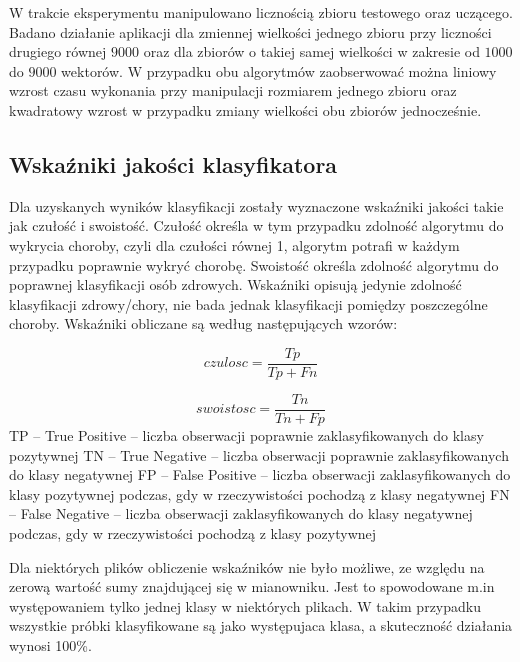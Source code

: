 W trakcie eksperymentu manipulowano licznością zbioru testowego oraz uczącego. Badano działanie aplikacji dla zmiennej wielkości jednego zbioru przy liczności drugiego równej $9000$ oraz dla zbiorów o takiej samej wielkości w zakresie od $1000$ do $9000$ wektorów. W przypadku obu algorytmów zaobserwować można liniowy wzrost czasu wykonania przy manipulacji rozmiarem jednego zbioru oraz kwadratowy wzrost w przypadku zmiany wielkości obu zbiorów jednocześnie.

\subsection{Wskaźniki jakości klasyfikatora}

Dla uzyskanych wyników klasyfikacji zostały wyznaczone wskaźniki jakości takie jak czułość i swoistość. Czułość określa w tym przypadku zdolność algorytmu do wykrycia choroby, czyli dla czułości równej 1, algorytm potrafi w każdym przypadku poprawnie wykryć chorobę. Swoistość określa zdolność algorytmu do poprawnej klasyfikacji osób zdrowych. Wskaźniki opisują jedynie zdolność klasyfikacji zdrowy/chory, nie bada jednak klasyfikacji pomiędzy poszczególne choroby. 
\newline
Wskaźniki obliczane są według następujących wzorów:

\begin{equation}
czulosc = \frac{Tp}{Tp+Fn}
\end{equation}

\begin{equation}
swoistosc = \frac{Tn}{Tn+Fp}
\end{equation}
\newline
TP – True Positive – liczba obserwacji poprawnie zaklasyfikowanych do klasy pozytywnej
\newline
TN – True Negative – liczba obserwacji poprawnie zaklasyfikowanych do klasy negatywnej
\newline
FP – False Positive – liczba obserwacji zaklasyfikowanych do klasy pozytywnej podczas, gdy w rzeczywistości pochodzą z klasy negatywnej
\newline
FN – False Negative – liczba obserwacji zaklasyfikowanych do klasy negatywnej podczas, gdy w rzeczywistości pochodzą z klasy pozytywnej


Dla niektórych plików obliczenie wskaźników nie było możliwe, ze względu na zerową wartość sumy znajdującej się w mianowniku. Jest to spowodowane m.in występowaniem tylko jednej klasy w niektórych plikach. W takim przypadku wszystkie próbki klasyfikowane są jako występujaca klasa, a skuteczność działania wynosi 100\%.

